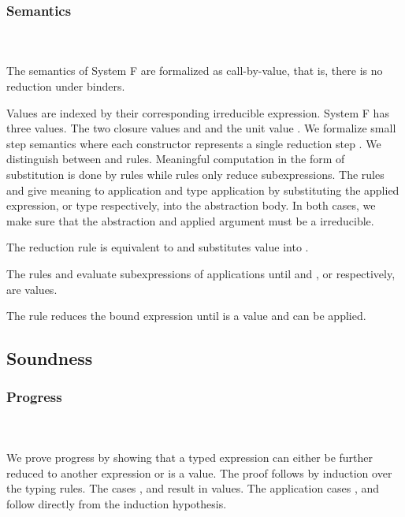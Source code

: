 \subsubsection{Semantics}\hfill\\\\
The semantics of System F are formalized as call-by-value, that is, there is no reduction under binders. 

\noindent Values are indexed by their corresponding irreducible expression.
\FVal
System F has three values. The two closure values  and  and the unit value .
We formalize small step semantics where each constructor represents a single reduction step   .
We distinguish between  and  rules. 
Meaningful computation in the form of substitution is done by  rules while  rules only reduce subexpressions.
\FSemantics
The rules  and  give meaning to application and type application by substituting the applied expression, or type respectively, into the abstraction body. In both cases, we make sure that the abstraction and applied argument must be a irreducible.

\noindent The reduction rule  is equivalent to  and substitutes value  into . 

\noindent The rules  and  evaluate subexpressions of applications until  and , or  respectively, are values. 

\noindent The rule  reduces the bound expression  until  is a value and  can be applied. 

\subsection{Soundness}

\subsubsection{Progress}\hfill\\\\
We prove progress by showing that a typed expression  can either be further reduced to another expression  or  is a value. The proof follows by induction over the typing rules. 
\FProgress
The cases ,  and  result in values. 
The application cases ,  and  follow directly from the induction hypothesis. 
